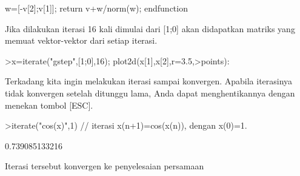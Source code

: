 \documentclass[a4paper,10pt]{article}
\begin{document}
\begin{eulernotebook}
\begin{eulercomment}
\begin{eulercomment}
\begin{eulercomment}
\begin{eulercomment}
\begin{eulercomment}
\begin{eulercomment}
\begin{eulercomment}
\begin{eulercomment}
\begin{eulercomment}
\begin{eulercomment}
\begin{eulercomment}
\begin{eulercomment}
\begin{eulercomment}
\begin{eulercomment}
\begin{eulercomment}
\begin{eulercomment}
\begin{eulercomment}
\begin{eulercomment}
\begin{eulercomment}
\begin{eulercomment}
\begin{eulerprompt}
\end{eulerprompt}
\begin{eulerudf}
  w=[-v[2];v[1]];
  return v+w/norm(w);
  endfunction
\end{eulerudf}
\begin{eulercomment}
Jika dilakukan iterasi 16 kali dimulai dari [1;0] akan didapatkan matriks yang memuat
vektor-vektor dari setiap iterasi.
\end{eulercomment}
\begin{eulerprompt}
>x=iterate("gstep",[1;0],16); plot2d(x[1],x[2],r=3.5,>points):
\end{eulerprompt}
\begin{eulercomment}
\begin{eulercomment}
\begin{eulercomment}
Terkadang kita ingin melakukan iterasi sampai konvergen. Apabila iterasinya tidak konvergen
setelah ditunggu lama, Anda dapat menghentikannya dengan menekan tombol [ESC].
\end{eulercomment}
\begin{eulerprompt}
>iterate("cos(x)",1) // iterasi x(n+1)=cos(x(n)), dengan x(0)=1.
\end{eulerprompt}
\begin{euleroutput}
  0.739085133216
\end{euleroutput}
\begin{eulercomment}
Iterasi tersebut konvergen ke penyelesaian persamaan


\end{eulercomment}
\end{eulercomment}
\end{eulercomment}
\end{eulercomment}
\end{eulercomment}
\end{eulercomment}
\end{eulercomment}
\end{eulercomment}
\end{eulercomment}
\end{eulercomment}
\end{eulercomment}
\end{eulercomment}
\end{eulercomment}
\end{eulercomment}
\end{eulercomment}
\end{eulercomment}
\end{eulercomment}
\end{eulercomment}
\end{eulercomment}
\end{eulercomment}
\end{eulercomment}
\end{eulercomment}
\end{eulercomment}
\end{eulernotebook}
\end{document}
